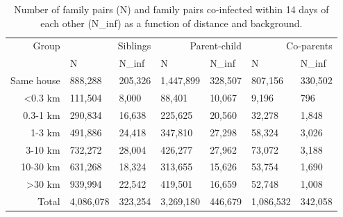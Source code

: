 \begin{table}[ht!]
\caption{Number of family pairs (N) and family pairs co-infected within 14 days of each other (N\_inf) as a function of distance and background.}
\label{t:summary_pairs_family}
\begin{tabular}{r|llllll}
\toprule
Group & \multicolumn{2}{r}{Siblings} & \multicolumn{2}{r}{Parent-child} & \multicolumn{2}{r}{Co-parents} \\
 & N & N_inf & N & N_inf & N & N_inf \\
\midrule
Same house & 888,288 & 205,326 & 1,447,899 & 328,507 & 807,156 & 330,502 \\
<0.3 km & 111,504 & 8,000 & 88,401 & 10,067 & 9,196 & 796 \\
0.3-1 km & 290,834 & 16,638 & 225,625 & 20,560 & 32,278 & 1,848 \\
1-3 km & 491,886 & 24,418 & 347,810 & 27,298 & 58,324 & 3,026 \\
3-10 km & 732,272 & 28,004 & 426,277 & 27,962 & 73,072 & 3,188 \\
10-30 km & 631,268 & 18,324 & 313,655 & 15,626 & 53,754 & 1,690 \\
>30 km & 939,994 & 22,542 & 419,501 & 16,659 & 52,748 & 1,008 \\
Total & 4,086,078 & 323,254 & 3,269,180 & 446,679 & 1,086,532 & 342,058 \\
\bottomrule
\end{tabular}
\end{table}
